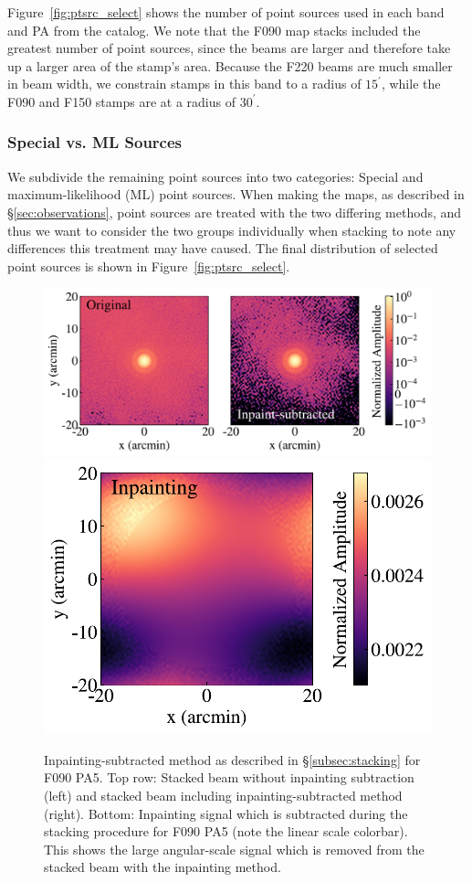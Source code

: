 Figure~\ref{fig:ptsrc_select} shows the number of point sources used in each band and PA from the catalog.  We note that the F090 map stacks included the greatest number of point sources, since the beams are larger and therefore take up a larger area of the stamp's area.  Because the F220 beams are much smaller in beam width, we constrain stamps in this band to a radius of $15^{\prime}$, while the F090 and F150 stamps are at a radius of $30^{\prime}$.

\subsubsection{Special vs. ML Sources}
\label{subsubsec:type_sel}
We subdivide the remaining point sources into two categories: Special and maximum-likelihood (ML) point sources.  When making the maps, as described in \S\ref{sec:observations}, point sources are treated with the two differing methods, and thus we want to consider the two groups individually when stacking to note any differences this treatment may have caused.  The final distribution of selected point sources is shown in Figure~\ref{fig:ptsrc_select}.

\begin{figure}[t]
    \centering
    \includegraphics[height=.35\textwidth]{Figures/inpaint1.pdf}
    \includegraphics[height=.35\textwidth]{Figures/inpaint2.pdf}
    \caption{Inpainting-subtracted method as described in \S\ref{subsec:stacking} for F090 PA5.  Top row: Stacked beam without inpainting subtraction (left) and stacked beam including inpainting-subtracted method (right).  Bottom: Inpainting signal which is subtracted during the stacking procedure for F090 PA5 (note the linear scale colorbar).  This shows the large angular-scale signal which is removed from the stacked beam with the inpainting method.}
    \label{fig:example_maps}
    \vspace{1em}
\end{figure}

